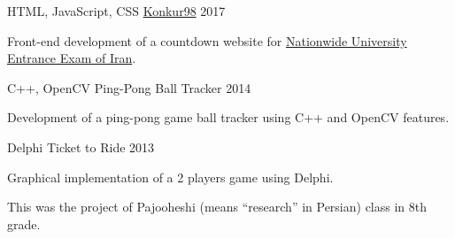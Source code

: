\begin{cventries}
  \cventry
    {HTML, JavaScript, CSS} %
    {\href{https://konkur98.ga}{Konkur98}} %
    {} %
    {2017} %
    {
      \begin{cvitems} %
      	\item {Front-end development of a countdown website for \href{https://en.wikipedia.org/wiki/Iranian_University_Entrance_Exam}{Nationwide University Entrance Exam of Iran}.}
      \end{cvitems}
    }

  \cventry
    {C++, OpenCV} %
    {Ping-Pong Ball Tracker} %
    {} %
    {2014} %
    {
      \begin{cvitems} %
        \item {Development of a ping-pong game ball tracker using C++ and OpenCV features.}
      \end{cvitems}
    }

  \cventry
    {Delphi} %
    {Ticket to Ride} %
    {} %
    {2013} %
    {
      \begin{cvitems} %
        \item {Graphical implementation of a 2 players game using Delphi.}
        \item {This was the project of Pajooheshi (means ``research” in Persian) class in 8th grade.}
      \end{cvitems}
    }

\end{cventries}
